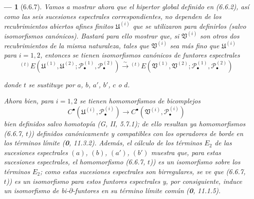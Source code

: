 \documentclass[10pt,oneside,openany]{book}
\theoremstyle{egaenv}\newtheorem*{env}{---}
\theoremstyle{egastatement}
\theoremstyle{egadescription}
\begin{document}
\begin{env}[6.6.7]
\label{III.6.6.7}
Vamos a mostrar ahora que el hipertor global definido en (6.6.2), así como
las seis sucesiones espectrales correspondientes, no dependen de los
recubrimientos abiertos afines finitos $\mathfrak U^{(i)}$ que se utilizaron
para definirlos (salvo isomorfismos canónicos). Bastará para ello mostrar que,
si $\mathfrak V^{(i)}$ son otros dos recubrimientos de la misma naturaleza,
tales que $\mathfrak V^{(i)}$ sea \emph{más fino} que $\mathfrak U^{(i)}$
para $i=1,2$, entonces se tienen \emph{isomorfismos canónicos} de funtores espectrales
\[
  {}^{(t)}E
  (\mathfrak U^{(1)},\mathfrak U^{(2)};
   \mathscr P_\bullet^{(1)},\mathscr P_\bullet^{(2)})
  \xrightarrow{\sim}
  {}^{(t)}E
  (\mathfrak V^{(1)},\mathfrak V^{(2)};
   \mathscr P_\bullet^{(1)},\mathscr P_\bullet^{(2)})
  \tag{6.6.7, $t$)}\label{III.6.6.7.t.fr}
\]

donde $t$ se sustituye por $a$, $b$, $a'$, $b'$, $c$ o $d$.

Ahora bien, para $i=1,2$ se tienen homomorfismos de bicomplejos
\[
  C^\bullet(\mathfrak U^{(i)},\mathscr P_\bullet^{(i)})
  \longrightarrow
  C^\bullet(\mathfrak V^{(i)},\mathscr P_\bullet^{(i)})
\]
bien definidos salvo homotopía (G, II, 5.7.1); de ello resultan ya
homomorfismos (6.6.7, $t$)) definidos canónicamente y compatibles con los
operadores de borde en los términos límite (\textbf{0}, 11.3.2). Además,
el cálculo de los términos $E_2$ de las sucesiones espectrales $(a)$, $(b)$,
$(a')$, $(b')$ muestra que, para estas sucesiones espectrales, el homomorfismo
(6.6.7, $t$)) es un isomorfismo sobre los términos $E_2$; como estas sucesiones
espectrales son birregulares, se ve que (6.6.7, $t$)) es un isomorfismo para
estos funtores espectrales y, por consiguiente, induce un \emph{isomorfismo de
bi-$\partial$-funtores} en su término límite común
(\textbf{0}, 11.1.5).


\end{env}
\end{document}
